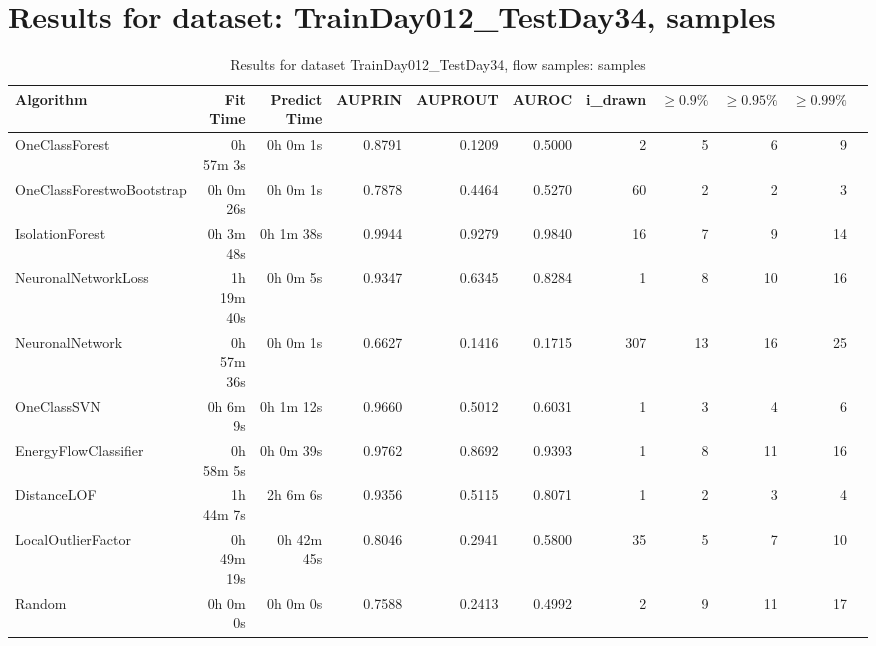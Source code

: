 \documentclass{article}
\begin{document}
\section*{Results for dataset: TrainDay012_TestDay34, samples}
\begin{table}[h!]
\centering
\caption{Results for dataset TrainDay012_TestDay34, flow samples: samples}
\begin{tabular}{lrrrrrrrrrr}
\toprule
Algorithm & Fit Time & Predict Time & AUPRIN & AUPROUT & AUROC & i\_drawn & $\geq 0.9\%$ & $\geq 0.95\%$ & $\geq 0.99\%$ \\
\midrule
OneClassForest & 0h 57m 3s & 0h 0m 1s & 0.8791 & 0.1209 & 0.5000 & 2 & 5 & 6 & 9 \\
OneClassForestwoBootstrap & 0h 0m 26s & 0h 0m 1s & 0.7878 & 0.4464 & 0.5270 & 60 & 2 & 2 & 3 \\
IsolationForest & 0h 3m 48s & 0h 1m 38s & 0.9944 & 0.9279 & 0.9840 & 16 & 7 & 9 & 14 \\
NeuronalNetworkLoss & 1h 19m 40s & 0h 0m 5s & 0.9347 & 0.6345 & 0.8284 & 1 & 8 & 10 & 16 \\
NeuronalNetwork & 0h 57m 36s & 0h 0m 1s & 0.6627 & 0.1416 & 0.1715 & 307 & 13 & 16 & 25 \\
OneClassSVN & 0h 6m 9s & 0h 1m 12s & 0.9660 & 0.5012 & 0.6031 & 1 & 3 & 4 & 6 \\
EnergyFlowClassifier & 0h 58m 5s & 0h 0m 39s & 0.9762 & 0.8692 & 0.9393 & 1 & 8 & 11 & 16 \\
DistanceLOF & 1h 44m 7s & 2h 6m 6s & 0.9356 & 0.5115 & 0.8071 & 1 & 2 & 3 & 4 \\
LocalOutlierFactor & 0h 49m 19s & 0h 42m 45s & 0.8046 & 0.2941 & 0.5800 & 35 & 5 & 7 & 10 \\
Random & 0h 0m 0s & 0h 0m 0s & 0.7588 & 0.2413 & 0.4992 & 2 & 9 & 11 & 17 \\
\bottomrule
\end{tabular}
\end{table}
\end{document}
